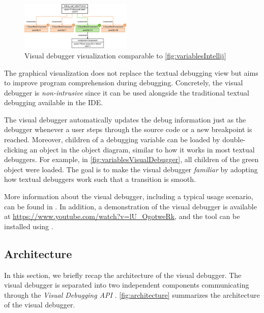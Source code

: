 \documentclass[sigconf]{acmart}
\begin{document}
\begin{figure}[ht]
    \centering
    \includegraphics[width=0.475\textwidth]{images/variables-visual-debugger.png}
    \caption{Visual debugger visualization comparable to \cref{fig:variablesIntellij}}
    \label{fig:variablesVisualDebugger}
\end{figure}

The graphical visualization does not replace the textual debugging view but aims to improve program comprehension during debugging\cite{krauterVisualDebuggerTool2022}.
Concretely, the visual debugger is \textit{non-intrusive} since it can be used alongside the traditional textual debugging available in the IDE.

The visual debugger automatically updates the debug information just as the \intellij{} debugger whenever a user steps through the source code or a new breakpoint is reached.
Moreover, children of a debugging variable can be loaded by double-clicking an object in the object diagram, similar to how it works in most textual debuggers.
For example, in \autoref{fig:variablesVisualDebugger}, all children of the green object were loaded.
The goal is to make the visual debugger \textit{familiar} by adopting how textual debuggers work such that a transition is smooth.

More information about the visual debugger, including a typical usage scenario, can be found in \cite{krauterVisualDebuggerTool2022}.
In addition, a demonstration of the visual debugger is available at \url{https://www.youtube.com/watch?v=lU_OgotweRk}, and the tool can be installed using \cite{timkrauterVisualDebuggerIntelliJ2023}.

\subsection{Architecture}
In this section, we briefly recap the architecture of the visual debugger.
The visual debugger is separated into two independent components communicating through the \textit{Visual Debugging API} \cite{krauterVisualDebuggerTool2022}.
\autoref{fig:architecture} summarizes the architecture of the visual debugger.
\end{document}
